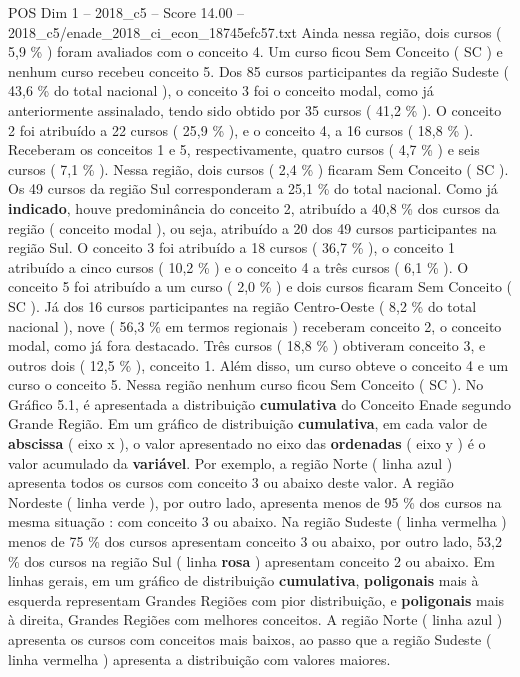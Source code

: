 \begin{textsample}{POS Dim 1 – 2018\_c5 – Score 14.00 – 2018\_c5/enade\_2018\_ci\_econ\_18745efc57.txt}
Ainda nessa região, dois cursos ( 5,9 \% ) foram avaliados com o conceito 4.
Um curso ficou Sem Conceito ( SC ) e nenhum curso recebeu conceito 5.
Dos 85 cursos participantes da região Sudeste ( 43,6 \% do total nacional ), o conceito 3 foi o conceito modal, como já anteriormente assinalado, tendo sido obtido por 35 cursos ( 41,2 \% ).
O conceito 2 foi atribuído a 22 cursos ( 25,9 \% ), e o conceito 4, a 16 cursos ( 18,8 \% ).
Receberam os conceitos 1 e 5, respectivamente, quatro cursos ( 4,7 \% ) e seis cursos ( 7,1 \% ).
Nessa região, dois cursos ( 2,4 \% ) ficaram Sem Conceito ( SC ).
Os 49 cursos da região Sul corresponderam a 25,1 \% do total nacional.
Como já \textbf{indicado}, houve predominância do conceito 2, atribuído a 40,8 \% dos cursos da região ( conceito modal ), ou seja, atribuído a 20 dos 49 cursos participantes na região Sul.
O conceito 3 foi atribuído a 18 cursos ( 36,7 \% ), o conceito 1 atribuído a cinco cursos ( 10,2 \% ) e o conceito 4 a três cursos ( 6,1 \% ).
O conceito 5 foi atribuído a um curso ( 2,0 \% ) e dois cursos ficaram Sem Conceito ( SC ).
Já dos 16 cursos participantes na região Centro-Oeste ( 8,2 \% do total nacional ), nove ( 56,3 \% em termos regionais ) receberam conceito 2, o conceito modal, como já fora destacado.
Três cursos ( 18,8 \% ) obtiveram conceito 3, e outros dois ( 12,5 \% ), conceito 1.
Além disso, um curso obteve o conceito 4 e um curso o conceito 5.
Nessa região nenhum curso ficou Sem Conceito ( SC ).
No Gráfico 5.1, é apresentada a distribuição \textbf{cumulativa} do Conceito Enade segundo Grande Região.
Em um gráfico de distribuição \textbf{cumulativa}, em cada valor de \textbf{abscissa} ( eixo x ), o valor apresentado no eixo das \textbf{ordenadas} ( eixo y ) é o valor acumulado da \textbf{variável}.
Por exemplo, a região Norte ( linha azul ) apresenta todos os cursos com conceito 3 ou abaixo deste valor.
A região Nordeste ( linha verde ), por outro lado, apresenta menos de 95 \% dos cursos na mesma situação : com conceito 3 ou abaixo.
Na região Sudeste ( linha vermelha ) menos de 75 \% dos cursos apresentam conceito 3 ou abaixo, por outro lado, 53,2 \% dos cursos na região Sul ( linha \textbf{rosa} ) apresentam conceito 2 ou abaixo.
Em linhas gerais, em um gráfico de distribuição \textbf{cumulativa}, \textbf{poligonais} mais à esquerda representam Grandes Regiões com pior distribuição, e \textbf{poligonais} mais à direita, Grandes Regiões com melhores conceitos.
A região Norte ( linha azul ) apresenta os cursos com conceitos mais baixos, ao passo que a região Sudeste ( linha vermelha ) apresenta a distribuição com valores maiores.

\end{textsample}
